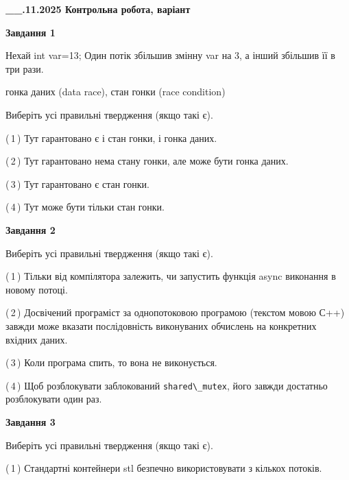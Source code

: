 \documentclass[12pt, ukrainian]{article}
\def\code#1{\Verb!#1!}
\begin{document}
\begin {large}

\textbf{\_\_.11.2025 Контрольна робота, варіант  }\par


{

\begin{center}
\textbf{Завдання 1}
\end{center}
Нехай int var=13; Один потік збільшив змінну var на 3, а інший збільшив її в три рази.

гонка даних (data race), стан гонки (race condition)

Виберіть усі правильні твердження (якщо такі є).\par
\vspace{2mm}
(\,1\,) Тут гарантовано є і стан гонки, і гонка даних.%

(\,2\,) Тут гарантовано нема стану гонки, але може бути гонка даних.%

(\,3\,) Тут гарантовано є стан гонки.%

(\,4\,) Тут може бути тільки стан гонки.%



\begin{center}
\textbf{Завдання 2}
\end{center}
Виберіть усі правильні твердження (якщо такі є).\par
\vspace{2mm}

(\,1\,) Тільки від компілятора залежить, чи запустить функція async виконання в новому потоці.%

(\,2\,) Досвічений програміст за однопотоковою програмою (текстом мовою С++) завжди може вказати послідовність виконуваних обчислень на конкретних вхідних даних.%

(\,3\,) Коли програма спить, то вона не виконується.%

(\,4\,) Щоб розблокувати заблокований \code{shared\_mutex}, його завжди достатньо розблокувати один раз.%



\begin{center}
\textbf{Завдання 3}
\end{center}
Виберіть усі правильні твердження (якщо такі є).\par
\vspace{2mm}

(\,1\,) Стандартні контейнери stl безпечно використовувати з кількох потоків.%

}
\end{large}
\end{document}
